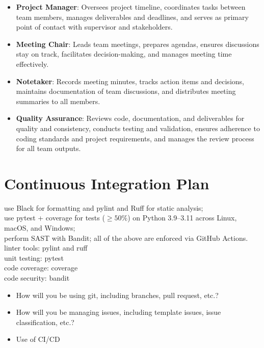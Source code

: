 \documentclass{article}
\begin{document}

\begin{itemize}
  \item \textbf{Project Manager}: Oversees project timeline, coordinates tasks between team members, manages deliverables and deadlines, and serves as primary point of contact with supervisor and stakeholders.
  \item \textbf{Meeting Chair}: Leads team meetings, prepares agendas, ensures discussions stay on track, facilitates decision-making, and manages meeting time effectively.
  \item \textbf{Notetaker}: Records meeting minutes, tracks action items and decisions, maintains documentation of team discussions, and distributes meeting summaries to all members.
  \item \textbf{Quality Assurance}: Reviews code, documentation, and deliverables for quality and consistency, conducts testing and validation, ensures adherence to coding standards and project requirements, and manages the review process for all team outputs.
\end{itemize}

\section{Continuous Integration Plan}
        use Black for formatting and pylint and Ruff for static analysis; \\
        use pytest + coverage for tests ($\geq 50\%$) on Python 3.9–3.11 across Linux, macOS, and Windows; \\
        perform SAST with Bandit; all of the above are enforced via GitHub Actions.\\

        linter tools: pylint and ruff\\
        unit testing: pytest\\
        code coverage: coverage\\
        code security: bandit\\


\begin{itemize}
  \item How will you be using git, including branches, pull request, etc.?
  \item How will you be managing issues, including template issues, issue
        classification, etc.?
  \item Use of CI/CD
\end{itemize}
\end{document}
